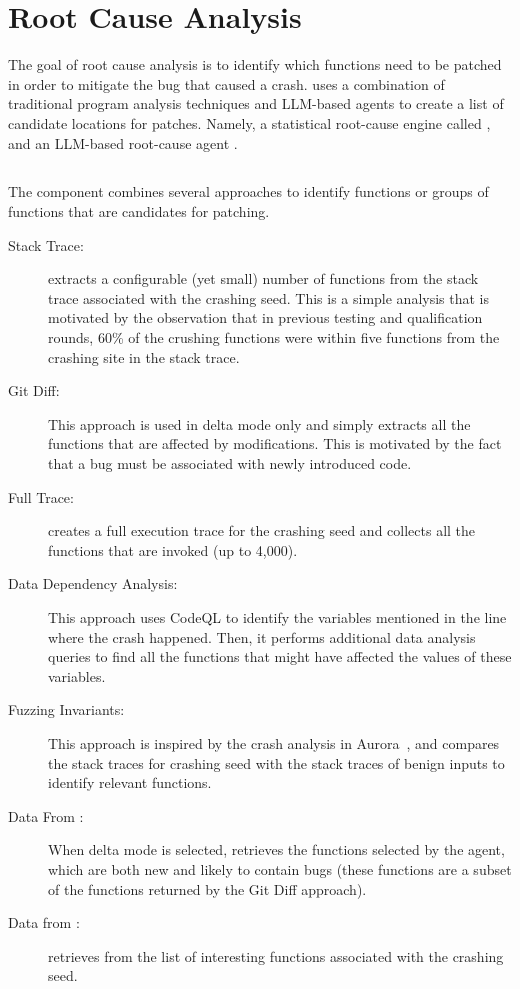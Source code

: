 \section{Root Cause Analysis}
\label{rootcause}

The goal of root cause analysis is to identify which functions need to be patched in order to mitigate the bug that caused a crash.
\artiphishell{} uses a combination of traditional program analysis techniques and LLM-based agents to create a list of candidate locations for patches. Namely, a statistical root-cause engine called \kumushi{}, and an LLM-based root-cause agent \dyva{}.


\subsection{\kumushi}
\label{kumushi}

The \kumushi component combines several approaches to identify functions or groups of functions that are candidates for patching.  

\begin{description}
\item[Stack Trace:] \kumushi extracts a configurable (yet small) number of functions from the stack trace associated with the crashing seed.
This is a simple analysis that is motivated by the observation that in previous testing and qualification rounds, 60\% of the crushing functions were within five functions from the crashing site in the stack trace.
\item[Git Diff:] This approach is used in delta mode only and simply extracts all the functions that are affected by modifications. This is motivated by the fact that a bug must be associated with newly introduced code.
\item[Full Trace:] \kumushi creates a full execution trace for the crashing seed and collects all the functions that are invoked (up to 4,000).
\item[Data Dependency Analysis:] This approach uses CodeQL to identify the variables mentioned in the line where the crash happened. 
Then, it performs additional data analysis queries to find all the functions that might have affected the values of these variables.
\item[Fuzzing Invariants:] This approach is inspired by the crash analysis in Aurora~\cite{aurora}, and compares the stack traces for crashing seed with the stack traces of benign inputs to identify relevant functions.
\item[Data From \diffguy:] When delta mode is selected, \kumushi retrieves the functions selected by the \diffguy agent, which are both new and likely to contain bugs (these functions are a subset of the functions returned by the Git Diff approach). 
\item[Data from \dyva:] \kumushi retrieves from \dyva the list of interesting functions associated with the crashing seed.
\end{description}

